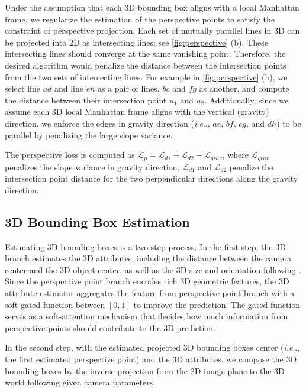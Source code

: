 \documentclass{article}
\makeatletter
\DeclareRobustCommand\onedot{\futurelet\@let@token\@onedot}
\def\@onedot{\ifx\@let@token.\else.\null\fi\xspace}
\def\ie{\emph{i.e}\onedot} \def\Ie{\emph{I.e}\onedot}
\makeatother
\begin{document}
Under the assumption that each 3D bounding box aligns with a local Manhattan frame, we regularize the estimation of the perspective points to satisfy the constraint of perspective projection. Each set of mutually parallel lines in 3D can be projected into 2D as intersecting lines; see \autoref{fig:perspective} (b). These intersecting lines should converge at the same vanishing point. Therefore, the desired algorithm would penalize the distance between the intersection points from the two sets of intersecting lines. For example in \autoref{fig:perspective} (b), we select line $ad$ and line $eh$ as a pair of lines, $bc$ and $fg$ as another, and compute the distance between their intersection point $u_1$ and $u_2$. Additionally, since we assume each 3D local Manhattan frame aligns with the vertical (gravity) direction, we enforce the edges in gravity direction (\ie, $ae$, $bf$, $cg$, and $dh$) to be parallel by penalizing the large slope variance.

The perspective loss is computed as $\mathcal{L}_{p} = \mathcal{L}_{d1} + \mathcal{L}_{d2} + \mathcal{L}_{grav}$, where $\mathcal{L}_{grav}$ penalizes the slope variance in gravity direction, $\mathcal{L}_{d1}$ and $\mathcal{L}_{d2}$ penalize the intersection point distance for the two perpendicular directions along the gravity direction.

\subsection{3D Bounding Box Estimation}
\label{sec:3dbox}

Estimating 3D bounding boxes is a two-step process. In the first step, the 3D branch estimates the 3D attributes, including the distance between the camera center and the 3D object center, as well as the 3D size and orientation following \citet{huang2018cooperative}. Since the perspective point branch encodes rich 3D geometric features, the 3D attribute estimator aggregates the feature from perspective point branch with a soft gated function between $[0, 1]$ to improve the prediction. The gated function serves as a soft-attention mechanism that decides how much information from perspective points should contribute to the 3D prediction.

In the second step, with the estimated projected 3D bounding boxes center (\ie, the first estimated perspective point) and the 3D attributes, we compose the 3D bounding boxes by the inverse projection from the 2D image plane to the 3D world following \citet{huang2018cooperative} given camera parameters.
\end{document}
